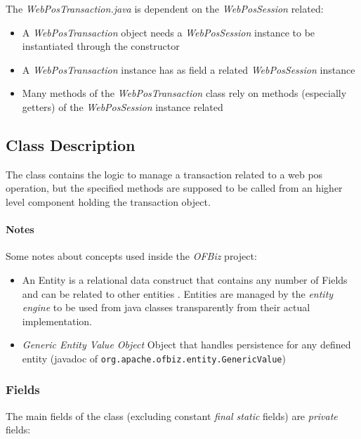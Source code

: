 The \emph{WebPosTransaction.java} is dependent on the \emph{WebPosSession} related:
\begin{itemize}
	\item A \emph{WebPosTransaction} object needs a \emph{WebPosSession} instance to be instantiated through the constructor
	\item A \emph{WebPosTransaction} instance has as field a related \emph{WebPosSession} instance
	\item Many methods of the \emph{WebPosTransaction} class rely on methods (especially getters) of the \emph{WebPosSession} instance related
\end{itemize}

\subsection{Class Description}
The class contains the logic to manage a transaction related to a web pos operation, but the specified methods are supposed to be called from an higher level component holding the transaction object.

\paragraph{Notes} Some notes about concepts used inside the \emph{OFBiz} project:
\begin{itemize}
 	\item An Entity is a relational data construct that contains any number of Fields and can be related to other entities \cite{OFBiz}. Entities are managed by the \emph{entity engine} to be used from java classes transparently from their actual implementation.
 	\item \emph{Generic Entity Value Object} Object that handles persistence for any defined entity (javadoc of \texttt{org.apache.ofbiz.entity.GenericValue})
\end{itemize}

\subsubsection{Fields}
The main fields of the class (excluding constant \emph{final static} fields)  are \emph{private} fields:

